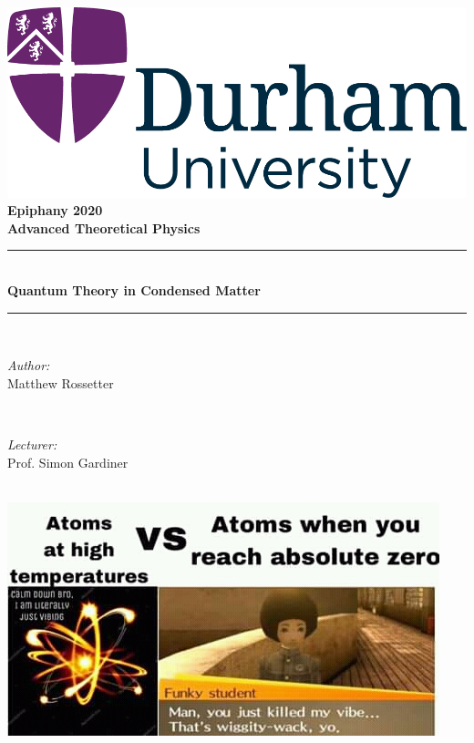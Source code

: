 \documentclass[a4paper, 11pt, normalem]{report}
\begin{document}
\begin{titlepage}
    \newcommand{\HRule}{\rule{\linewidth}{0.5mm}}
    \center
    {\includegraphics[scale=0.5]{../../logo0.png}\hfill{\Large\bfseries Epiphany 2020}}\\[2.5cm]
    {\LARGE\bfseries Advanced Theoretical Physics}\\[1.5cm]
    \HRule \\[0.7cm]
    {\huge\bfseries Quantum Theory in Condensed Matter}\\[0.4cm]
    \HRule \\[1.5cm]

    \begin{minipage}{0.4\textwidth}
        \begin{flushleft} \large
            \emph{Author:} \\ Matthew Rossetter
        \end{flushleft}
    \end{minipage}~
    \begin{minipage}{0.4\textwidth}
        \begin{flushright} \large
            \emph{Lecturer:} \\ Prof. Simon Gardiner
        \end{flushright}
    \end{minipage}\\[2cm]
    \vfill
    \includegraphics[width=\textwidth]{wig.jpg}\\[1cm]
    \vfill
\end{titlepage}
\tableofcontents
\end{document}
